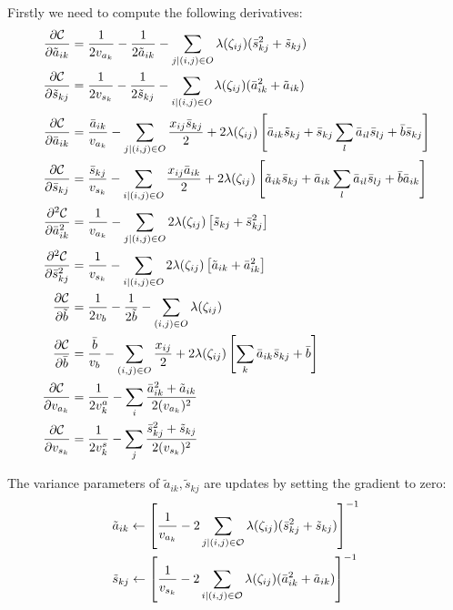 \documentclass{article}
\newcommand{\obs}{O}
\newcommand{\atil}{\tilde{a}}
\newcommand{\abar}{\bar{a}}
\newcommand{\stil}{\tilde{s}}
\newcommand{\sbar}{\bar{s}}
\newcommand{\btil}{\tilde{b}}
\newcommand{\bbar}{\bar{b}}
\begin{document}
Firstly we need to compute the following derivatives:
\begin{align}
\frac{\partial \mathcal{C}}{\partial \atil_{ik}} &= \frac{1}{2v_{a_k}}-\frac{1}{2\atil_{ik}}-\sum_{j|(i,j)\in\obs}\lambda(\zeta_{ij})(\sbar_{kj}^2+\stil_{kj}) \notag\\
\frac{\partial \mathcal{C}}{\partial \stil_{kj}} &= \frac{1}{2v_{s_k}}-\frac{1}{2\stil_{kj}}-\sum_{i|(i,j)\in\obs}\lambda(\zeta_{ij})(\abar_{ik}^2+\atil_{ik}) \notag\\
\frac{\partial \mathcal{C}}{\partial \abar_{ik}} &= \frac{\abar_{ik}}{v_{a_k}}-\sum_{j|(i,j)\in\obs}\frac{x_{ij}\sbar_{kj}}{2}+2\lambda(\zeta_{ij})\left[\abar_{ik}\stil_{kj}+\sbar_{kj}\sum_l\abar_{il}\sbar_{lj} 
+ \bbar\sbar_{kj} \right] \notag\\
\frac{\partial \mathcal{C}}{\partial \sbar_{kj}} &= \frac{\sbar_{kj}}{v_{s_k}}-\sum_{i|(i,j)\in\obs}\frac{x_{ij}\abar_{ik}}{2}+2\lambda(\zeta_{ij})\left[\atil_{ik}\sbar_{kj}+\abar_{ik}\sum_l\abar_{il}\sbar_{lj}+\bbar\abar_{ik}\right] \notag\\
\frac{\partial^2\mathcal{C}}{\partial \abar_{ik}^2} &= \frac{1}{v_{a_k}} - \sum_{j|(i,j)\in\obs}2\lambda(\zeta_{ij})\left[ \stil_{kj}+\sbar_{kj}^2\right] \notag \\
\frac{\partial^2\mathcal{C}}{\partial \sbar_{kj}^2} &= \frac{1}{v_{s_k}} - \sum_{i|(i,j)\in\obs}2\lambda(\zeta_{ij})\left[ \atil_{ik}+\abar_{ik}^2\right] \notag \\
\frac{\partial \mathcal{C}}{\partial \btil} &= \frac{1}{2v_b} - \frac{1}{2\btil} - \sum_{(i,j)\in\obs}\lambda(\zeta_{ij}) \notag \\
\frac{\partial \mathcal{C}}{\partial \bbar} &= \frac{\bbar}{v_b} - \sum_{(i,j)\in\obs}\frac{x_{ij}}{2}+2\lambda(\zeta_{ij})\left[\sum_k\abar_{ik}\sbar_{kj}+\bbar \right] \notag \\
\frac{\partial \mathcal{C}}{\partial v_{a_k}} &= \frac{1}{2v^a_k}-\sum_i\frac{\abar_{ik}^2+\atil_{ik}}{2(v_{a_k})^2} \notag \\
\frac{\partial \mathcal{C}}{\partial v_{s_k}} &= \frac{1}{2v^s_k}-\sum_j\frac{\sbar_{kj}^2+\stil_{kj}}{2(v_{s_k})^2} \notag
\end{align}

The variance parameters of $\atil_{ik},\stil_{kj}$ are updates by setting the gradient to zero:
\begin{align}
&\atil_{ik} \leftarrow \left[\frac{1}{v_{a_k}} - 2\sum_{j|(i,j)\in\mathcal{O}}\lambda(\zeta_{ij})(\sbar_{kj}^2+\stil_{kj}) \right]^{-1}\notag\\
&\stil_{kj} \leftarrow \left[\frac{1}{v_{s_k}} - 2\sum_{i|(i,j)\in\mathcal{O}}\lambda(\zeta_{ij})(\abar_{ik}^2+\atil_{ik}) \right]^{-1}\notag
\end{align} 
\end{document}

